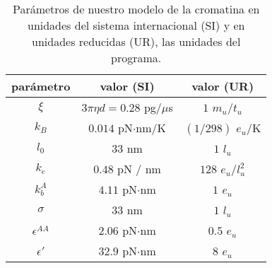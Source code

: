 \begin{table}
    \centering
    \begin{tabular}{c c c}
        \toprule
        parámetro       & valor (SI)                  & valor (UR)          \\
        \midrule
        $\xi$           & $3\pi\eta d=0.28$ pg/$\mu$s & $1$ $m_u$/$t_u$     \\
        $k_B$           & $0.014$ pN$\cdot$nm/K       & $(1/298)$ $e_u$/K   \\
        $l_0$           & $33$ nm                     & $1$ $l_u$           \\
        $k_e$           & $0.48$ pN / nm              & $128$ $e_u$/$l_u^2$ \\
        $k_b^A$         & $4.11$ pN$\cdot$nm          & $1$ $e_u$           \\
        $\sigma$        & $33$ nm                     & $1$ $l_u$           \\
        $\epsilon^{AA}$ & $2.06$ pN$\cdot$nm          & $0.5$ $e_u$         \\
        $\epsilon'$     & $32.9$ pN$\cdot$nm          & $8$ $e_u$           \\
        \bottomrule
    \end{tabular}
    \caption{Parámetros de nuestro modelo de la cromatina en unidades del sistema internacional (SI) y en unidades reducidas (UR), las unidades del programa.}
    \label{tab:parameters}
\end{table}
